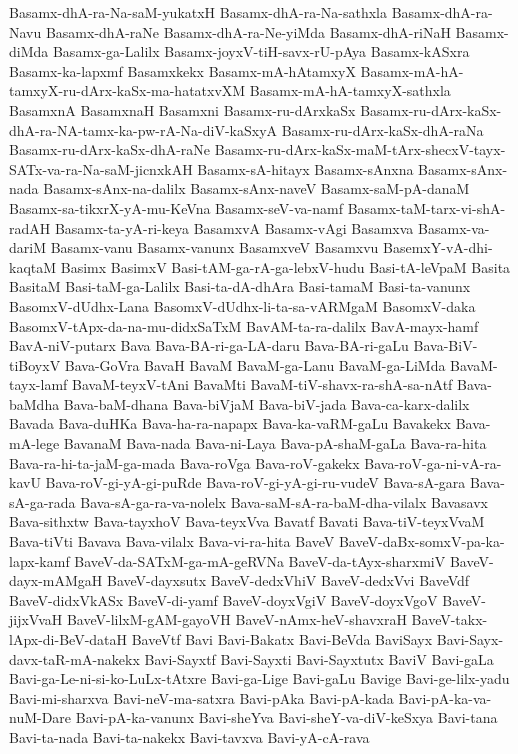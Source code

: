 {Basamx-dhA-ra-Na-saM-yukatxH
Basamx-dhA-ra-Na-sathxla
Basamx-dhA-ra-Navu
Basamx-dhA-raNe
Basamx-dhA-ra-Ne-yiMda
Basamx-dhA-riNaH
Basamx-diMda
Basamx-ga-Lalilx
Basamx-joyxV-tiH-savx-rU-pAya
Basamx-kASxra
Basamx-ka-lapxmf
Basamxkekx
Basamx-mA-hAtamxyX
Basamx-mA-hA-tamxyX-ru-dArx-kaSx-ma-hatatxvXM
Basamx-mA-hA-tamxyX-sathxla
BasamxnA
BasamxnaH
Basamxni
Basamx-ru-dArxkaSx
Basamx-ru-dArx-kaSx-dhA-ra-NA-tamx-ka-pw-rA-Na-diV-kaSxyA
Basamx-ru-dArx-kaSx-dhA-raNa
Basamx-ru-dArx-kaSx-dhA-raNe
Basamx-ru-dArx-kaSx-maM-tArx-shecxV-tayx-SATx-va-ra-Na-saM-jicnxkAH
Basamx-sA-hitayx
Basamx-sAnxna
Basamx-sAnx-nada
Basamx-sAnx-na-dalilx
Basamx-sAnx-naveV
Basamx-saM-pA-danaM
Basamx-sa-tikxrX-yA-mu-KeVna
Basamx-seV-va-namf
Basamx-taM-tarx-vi-shA-radAH
Basamx-ta-yA-ri-keya
BasamxvA
Basamx-vAgi
Basamxva
Basamx-va-dariM
Basamx-vanu
Basamx-vanunx
BasamxveV
Basamxvu
BasemxY-vA-dhi-kaqtaM
Basimx
BasimxV
Basi-tAM-ga-rA-ga-lebxV-hudu
Basi-tA-leVpaM
Basita
BasitaM
Basi-taM-ga-Lalilx
Basi-ta-dA-dhAra
Basi-tamaM
Basi-ta-vanunx
BasomxV-dUdhx-Lana
BasomxV-dUdhx-li-ta-sa-vARMgaM
BasomxV-daka
BasomxV-tApx-da-na-mu-didxSaTxM
BavAM-ta-ra-dalilx
BavA-mayx-hamf
BavA-niV-putarx
Bava
Bava-BA-ri-ga-LA-daru
Bava-BA-ri-gaLu
Bava-BiV-tiBoyxV
Bava-GoVra
BavaH
BavaM
BavaM-ga-Lanu
BavaM-ga-LiMda
BavaM-tayx-lamf
BavaM-teyxV-tAni
BavaMti
BavaM-tiV-shavx-ra-shA-sa-nAtf
Bava-baMdha
Bava-baM-dhana
Bava-biVjaM
Bava-biV-jada
Bava-ca-karx-dalilx
Bavada
Bava-duHKa
Bava-ha-ra-napapx
Bava-ka-vaRM-gaLu
Bavakekx
Bava-mA-lege
BavanaM
Bava-nada
Bava-ni-Laya
Bava-pA-shaM-gaLa
Bava-ra-hita
Bava-ra-hi-ta-jaM-ga-mada
Bava-roVga
Bava-roV-gakekx
Bava-roV-ga-ni-vA-ra-kavU
Bava-roV-gi-yA-gi-puRde
Bava-roV-gi-yA-gi-ru-vudeV
Bava-sA-gara
Bava-sA-ga-rada
Bava-sA-ga-ra-va-nolelx
Bava-saM-sA-ra-baM-dha-vilalx
Bavasavx
Bava-sithxtw
Bava-tayxhoV
Bava-teyxVva
Bavatf
Bavati
Bava-tiV-teyxVvaM
Bava-tiVti
Bavava
Bava-vilalx
Bava-vi-ra-hita
BaveV
BaveV-daBx-somxV-pa-ka-lapx-kamf
BaveV-da-SATxM-ga-mA-geRVNa
BaveV-da-tAyx-sharxmiV
BaveV-dayx-mAMgaH
BaveV-dayxsutx
BaveV-dedxVhiV
BaveV-dedxVvi
BaveVdf
BaveV-didxVkASx
BaveV-di-yamf
BaveV-doyxVgiV
BaveV-doyxVgoV
BaveV-jijxVvaH
BaveV-lilxM-gAM-gayoVH
BaveV-nAmx-heV-shavxraH
BaveV-takx-lApx-di-BeV-dataH
BaveVtf
Bavi
Bavi-Bakatx
Bavi-BeVda
BaviSayx
Bavi-Sayx-davx-taR-mA-nakekx
Bavi-Sayxtf
Bavi-Sayxti
Bavi-Sayxtutx
BaviV
Bavi-gaLa
Bavi-ga-Le-ni-si-ko-LuLx-tAtxre
Bavi-ga-Lige
Bavi-gaLu
Bavige
Bavi-ge-lilx-yadu
Bavi-mi-sharxva
Bavi-neV-ma-satxra
Bavi-pAka
Bavi-pA-kada
Bavi-pA-ka-va-nuM-Dare
Bavi-pA-ka-vanunx
Bavi-sheYva
Bavi-sheY-va-diV-keSxya
Bavi-tana
Bavi-ta-nada
Bavi-ta-nakekx
Bavi-tavxva
Bavi-yA-cA-rava
}
